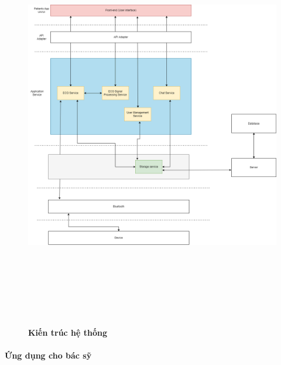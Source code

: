 \begin{figure}[H]
  \centering
  \includegraphics[width=16cm,height=18cm]{Images/system/fmECG_architecture-Patient.drawio.png}
  \caption[Kiến trúc hệ thống]{\bfseries \fontsize{12pt}{0pt}\selectfont Kiến trúc hệ thống}
  \label{hinh15} %
\end{figure}

\paragraph{Ứng dụng cho bác sỹ}
\mbox{}



